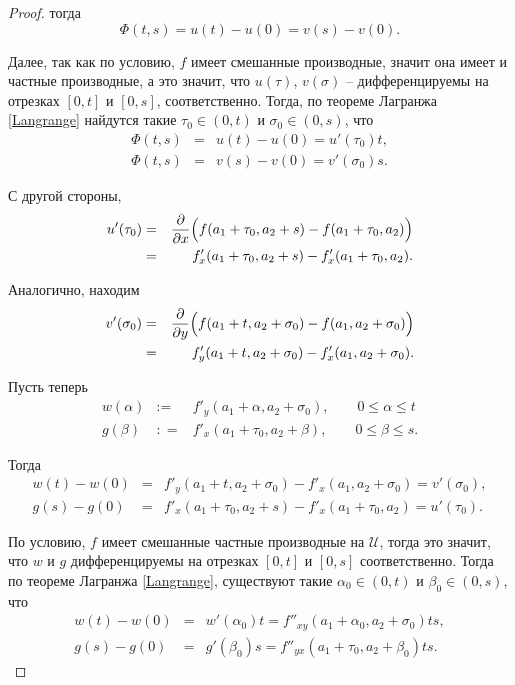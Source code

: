 \begin{proof}
тогда
\[
 \Phi(t,s) = u(t) - u(0) = v(s) - v(0).
\]

Далее, так как по условию, $f$ имеет смешанные производные, значит она имеет и частные производные, а это значит, что $u(\tau)$, $v(\sigma)$ -- дифференцируемы на отрезках $[0,t]$ и $[0,s]$, соответственно. Тогда, по теореме Лагранжа \ref{Langrange} найдутся такие $\tau_0 \in (0, t)$ и $\sigma_0 \in (0, s)$, что
\begin{eqnarray*}
    \Phi(t,s) &=& u(t) - u(0) = u'(\tau_0)t,\\
    \Phi(t,s) &=& v(s) - v(0) = v'(\sigma_0)s.
\end{eqnarray*}

С другой стороны, 
\begin{eqnarray*}
    u'(\tau_0) &=& \frac{\partial}{ \partial x}\Bigl( f(a_1 + \tau_0, a_2 + s) - f(a_1+ \tau_0, a_2)\Bigr) \\
    &=& f'_x(a_1 + \tau_0, a_2 + s) - f'_x(a_1+ \tau_0, a_2).
\end{eqnarray*}

Аналогично, находим
\begin{eqnarray*}
    v'(\sigma_0) &=& \frac{\partial}{ \partial y}\Bigl( f(a_1+t, a_2 + \sigma_0) - f(a_1, a_2+\sigma_0)\Bigr) \\
    &=& f'_y(a_1 + t, a_2 + \sigma_0) - f'_x(a_1, a_2+\sigma_0).
\end{eqnarray*}

Пусть теперь
\begin{eqnarray*}
    w(\alpha) &:=& f'_y(a_1 + \alpha, a_2 + \sigma_0), \qquad 0 \le \alpha \le t \\
    g(\beta) &: =& f'_x(a_1 + \tau_0, a_2 + \beta), \qquad 0 \le \beta \le s.
\end{eqnarray*}

Тогда
\begin{eqnarray*}
    w(t)- w(0) &=& f'_y(a_1 + t, a_2 + \sigma_0) - f'_x(a_1, a_2+\sigma_0)= v'(\sigma_0),\\
    g(s) - g(0) &=& f'_x(a_1 + \tau_0, a_2 + s) - f'_x(a_1+ \tau_0, a_2) = u'(\tau_0).
\end{eqnarray*}

По условию, $f$ имеет смешанные частные производные на $\mathscr{U}$, тогда это значит, что $w$ и $g$ дифференцируемы на отрезках $[0,t]$ и $[0,s]$ соответственно. Тогда по теореме Лагранжа \ref{Langrange}, существуют такие $\alpha_0 \in (0,t)$ и $\beta_0 \in (0,s)$, что
\begin{eqnarray*}
    w(t)- w(0) &=& w'(\alpha_0) t = f''_{xy}(a_1+\alpha_0, a_2+\sigma_0)ts,\\
    g(s) -g(0) &=& g'(\beta_0)s = f''_{yx}(a_1 + \tau_0,a_2+\beta_0)ts.
\end{eqnarray*}


\end{proof}

